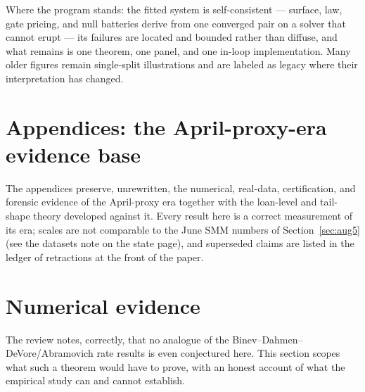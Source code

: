 \documentclass[11pt]{article}
\begin{document}
Where the program stands: the fitted system is self-consistent --- surface,
law, gate pricing, and null batteries derive from one converged pair on a
solver that cannot erupt --- its failures are located and bounded rather than
diffuse, and what remains is one theorem, one panel, and one in-loop
implementation. Many older figures remain single-split illustrations and are
labeled as legacy where their interpretation has changed.

\appendix
\section*{Appendices: the April-proxy-era evidence base}
The appendices preserve, unrewritten, the numerical, real-data, certification, and
forensic evidence of the April-proxy era together with the loan-level and tail-shape
theory developed against it. Every result here is a correct measurement of its era;
scales are not comparable to the June SMM numbers of Section~\ref{sec:aug5} (see the
datasets note on the state page), and superseded claims are listed in the ledger of
retractions at the front of the paper.

\section{Numerical evidence}\label{sec:numerics}
\label{sec:oracle}

The review notes, correctly, that no analogue of the
Binev--Dahmen--DeVore/Abramovich rate results is even conjectured here. This
section scopes what such a theorem would have to prove, with an honest
account of what the empirical study can and cannot establish.
\end{document}
